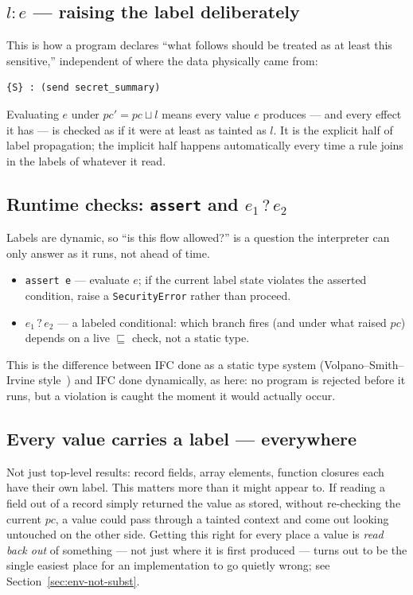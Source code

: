 \documentclass[11pt, a4paper]{article}
\newcommand{\flowsto}{\sqsubseteq}
\newcommand{\joinop}{\sqcup}
\begin{document}
\begin{descirption}
{\subsection{\texorpdfstring{$l : e$}{l : e} --- raising the label deliberately}

This is how a program declares ``what follows should be treated as at
least this sensitive,'' independent of where the data physically came
from:

\begin{lstlisting}
{S} : (send secret_summary)
\end{lstlisting}

Evaluating $e$ under $pc' = pc \joinop l$ means every value $e$ produces
--- and every effect it has --- is checked as if it were at least as
tainted as $l$. It is the explicit half of label propagation; the
implicit half happens automatically every time a rule joins in the labels
of whatever it read.

\subsection{Runtime checks: \texttt{assert} and \texorpdfstring{$e_1\mathbin{?}e_2$}{e1 ? e2}}

Labels are dynamic, so ``is this flow allowed?'' is a question the
interpreter can only answer as it runs, not ahead of time.

\begin{itemize}
  \item \lstinline{assert e} --- evaluate $e$; if the current label state
    violates the asserted condition, raise a \texttt{SecurityError} rather
    than proceed.
  \item $e_1 \mathbin{?} e_2$ --- a labeled conditional: which branch
    fires (and under what raised $pc$) depends on a live $\flowsto$ check,
    not a static type.
\end{itemize}

This is the difference between IFC done as a static type system
(Volpano--Smith--Irvine style~\cite{volpano1996}) and IFC done
dynamically, as here: no program is rejected before it runs, but a
violation is caught the moment it would actually occur.

\subsection{Every value carries a label --- everywhere}

Not just top-level results: record fields, array elements, function
closures each have their own label. This matters more than it might
appear to. If reading a field out of a record simply returned the value
as stored, without re-checking the current $pc$, a value could pass
through a tainted context and come out looking untouched on the other
side. Getting this right for every place a value is \emph{read back out}
of something --- not just where it is first produced --- turns out to be
the single easiest place for an implementation to go quietly wrong; see
Section~\ref{sec:env-not-subst}.

}
\end{descirption}
\end{document}
